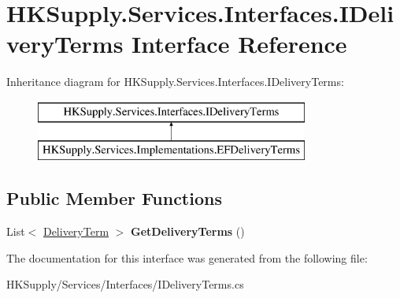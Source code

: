 \hypertarget{interface_h_k_supply_1_1_services_1_1_interfaces_1_1_i_delivery_terms}{}\section{H\+K\+Supply.\+Services.\+Interfaces.\+I\+Delivery\+Terms Interface Reference}
\label{interface_h_k_supply_1_1_services_1_1_interfaces_1_1_i_delivery_terms}
Inheritance diagram for H\+K\+Supply.\+Services.\+Interfaces.\+I\+Delivery\+Terms\+:\begin{figure}[H]
\begin{center}
\leavevmode
\includegraphics[height=2.000000cm]{interface_h_k_supply_1_1_services_1_1_interfaces_1_1_i_delivery_terms}
\end{center}
\end{figure}
\subsection*{Public Member Functions}
\begin{DoxyCompactItemize}
\item 
\mbox{\label{interface_h_k_supply_1_1_services_1_1_interfaces_1_1_i_delivery_terms_a659607888b92ab195e9f2cac9456f6e0}} 
List$<$ \mbox{\hyperlink{class_h_k_supply_1_1_models_1_1_delivery_term}{Delivery\+Term}} $>$ {\bfseries Get\+Delivery\+Terms} ()
\end{DoxyCompactItemize}


The documentation for this interface was generated from the following file\+:\begin{DoxyCompactItemize}
\item 
H\+K\+Supply/\+Services/\+Interfaces/I\+Delivery\+Terms.\+cs\end{DoxyCompactItemize}

